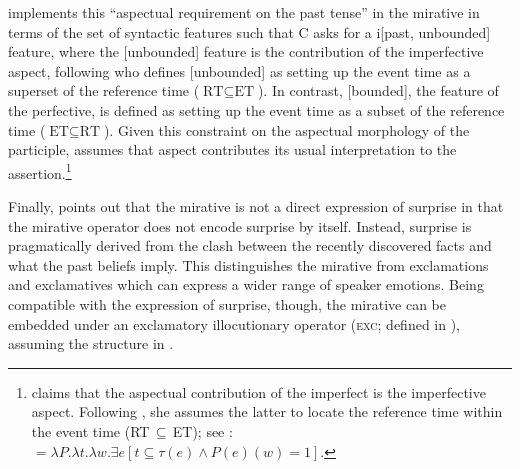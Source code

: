 \documentclass[output=paper]{langscibook}
\begin{document}
\citet[115]{Bustamante2013} implements this ``aspectual requirement on the past tense'' in the  mirative in terms of the set of syntactic features such that C asks for a i[past, unbounded] feature, where the [unbounded] feature is the
contribution of the imperfective aspect, following \citet{Pancheva2003} who defines [unbounded] as setting up the event time as a superset of the reference time ($\text{RT}\subseteq\text{ET}$). In contrast, [bounded], the feature of the perfective, is defined as setting up the event time as a subset of the reference time ($\text{ET}\subseteq\text{RT}$).
Given this constraint on the aspectual morphology of the participle, \citet[51]{Bustamante2013} assumes that aspect contributes its usual interpretation to the assertion.\footnote{\label{fn:34} \citet[51--52]{Bustamante2013} claims that the aspectual contribution of the imperfect is the imperfective aspect. Following \citet{Kratzer1998}, she assumes the latter to locate the reference time within the event time (RT\,$\subseteq$\,ET); see :
\ea\label{def:imperfect}
 $ = \lambda P.\lambda t.\lambda w. \exists e [t \subseteq \tau(e) \wedge P(e)(w)=1]$.
\z}




Finally, \citet[14]{Bustamante2013} points out that the  mirative is not a direct expression of surprise in that the mirative operator does not encode surprise by itself. Instead, surprise is pragmatically derived from the clash between the recently discovered facts and what the past beliefs imply. This distinguishes the  mirative from exclamations and exclamatives which can express a wider range of speaker emotions. Being compatible with the expression of surprise, though, the mirative can be embedded under an exclamatory illocutionary operator (\textsc{exc}; defined in \citealt{Gutierrez-Rexach1996}), assuming the structure in .
\end{document}

